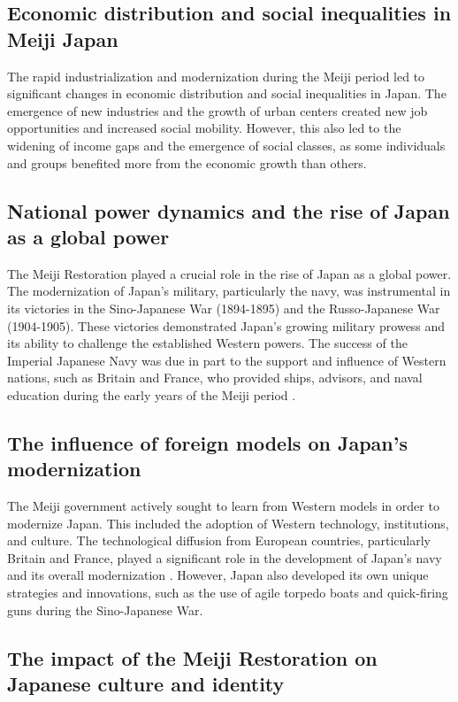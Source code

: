 \documentclass{article}
\begin{document}
\subsection{Economic distribution and social inequalities in Meiji Japan}

The rapid industrialization and modernization during the Meiji period led to significant changes in economic distribution and social inequalities in Japan. The emergence of new industries and the growth of urban centers created new job opportunities and increased social mobility. However, this also led to the widening of income gaps and the emergence of social classes, as some individuals and groups benefited more from the economic growth than others.

\subsection{National power dynamics and the rise of Japan as a global power}

The Meiji Restoration played a crucial role in the rise of Japan as a global power. The modernization of Japan's military, particularly the navy, was instrumental in its victories in the Sino-Japanese War (1894-1895) and the Russo-Japanese War (1904-1905). These victories demonstrated Japan's growing military prowess and its ability to challenge the established Western powers. The success of the Imperial Japanese Navy was due in part to the support and influence of Western nations, such as Britain and France, who provided ships, advisors, and naval education during the early years of the Meiji period \cite{Morette2017TechnologicalDI}.

\subsection{The influence of foreign models on Japan's modernization}

The Meiji government actively sought to learn from Western models in order to modernize Japan. This included the adoption of Western technology, institutions, and culture. The technological diffusion from European countries, particularly Britain and France, played a significant role in the development of Japan's navy and its overall modernization \cite{Morette2017TechnologicalDI}. However, Japan also developed its own unique strategies and innovations, such as the use of agile torpedo boats and quick-firing guns during the Sino-Japanese War.

\subsection{The impact of the Meiji Restoration on Japanese culture and identity}
\end{document}
